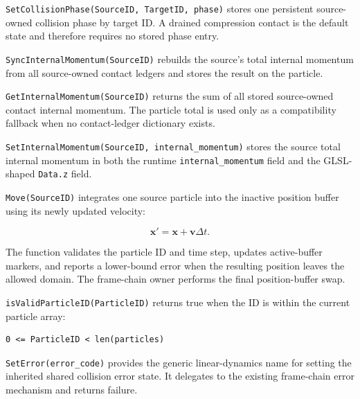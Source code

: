 \texttt{SetCollisionPhase(SourceID, TargetID, phase)} stores one persistent
source-owned collision phase by target ID.  A drained compression contact is
the default state and therefore requires no stored phase entry.


\texttt{SyncInternalMomentum(SourceID)} rebuilds the source's total internal
momentum from all source-owned contact ledgers and stores the result on the
particle.


\texttt{GetInternalMomentum(SourceID)} returns the sum of all stored
source-owned contact internal momentum.  The particle total is used only as a
compatibility fallback when no contact-ledger dictionary exists.


\texttt{SetInternalMomentum(SourceID, internal\_momentum)} stores the source
total internal momentum in both the runtime \texttt{internal\_momentum} field
and the GLSL-shaped \texttt{Data.z} field.


\texttt{Move(SourceID)} integrates one source particle into the inactive
position buffer using its newly updated velocity:

\begin{equation}
\mathbf{x}' = \mathbf{x}+\mathbf{v}\Delta t.
\end{equation}

The function validates the particle ID and time step, updates active-buffer
markers, and reports a lower-bound error when the resulting position leaves the
allowed domain.  The frame-chain owner performs the final position-buffer swap.


\texttt{isValidParticleID(ParticleID)} returns true when the ID is within the
current particle array:

\begin{verbatim}
0 <= ParticleID < len(particles)
\end{verbatim}


\texttt{SetError(error\_code)} provides the generic linear-dynamics name for
setting the inherited shared collision error state.  It delegates to the
existing frame-chain error mechanism and returns failure.
